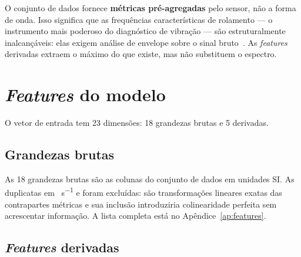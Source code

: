 \begin{limitacao}
O conjunto de dados fornece \textbf{métricas pré-agregadas} pelo sensor, não a
forma de onda. Isso significa que as frequências características de rolamento
--- o instrumento mais poderoso do diagnóstico de vibração --- são
estruturalmente inalcançáveis: elas exigem análise de envelope sobre o sinal
bruto~\cite{randall2011tutorial}. As \textit{features} derivadas extraem o
máximo do que existe, mas não substituem o espectro.
\end{limitacao}

\section{\textit{Features} do modelo}
\label{sec:features}

O vetor de entrada tem 23 dimensões: 18 grandezas brutas e 5 derivadas.

\subsection{Grandezas brutas}

As 18 grandezas brutas são as colunas do conjunto de dados em unidades SI. As
duplicatas em \si{\inch\per\second} e \si{\degF} foram excluídas: são
transformações lineares exatas das contrapartes métricas e sua inclusão
introduziria colinearidade perfeita sem acrescentar informação. A lista completa
está no Apêndice~\ref{ap:features}.

\subsection{\textit{Features} derivadas}

